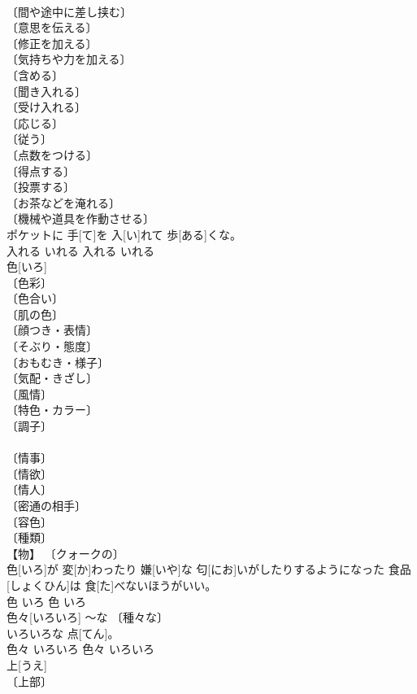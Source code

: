 \documentclass[8pt]{extreport}
\begin{document}
\begin{CJK}{UTF8}{min}
\\	〔間や途中に差し挟む〕 
\\	〔意思を伝える〕 
\\	〔修正を加える〕 
\\	〔気持ちや力を加える〕 
\\	〔含める〕 
\\	〔聞き入れる〕 
\\	〔受け入れる〕 
\\	〔応じる〕 
\\	〔従う〕 
\\	〔点数をつける〕 
\\	〔得点する〕 
\\	〔投票する〕 
\\	〔お茶などを淹れる〕 
\\	〔機械や道具を作動させる〕 
\\	ポケットに 手[て]を 入[い]れて 歩[ある]くな。	
\\	入れる	いれる	入れる	いれる	
\\	色[いろ]	
\\	〔色彩〕 
\\	〔色合い〕 
\\	〔肌の色〕 
\\	〔顔つき・表情〕 
\\	〔そぶり・態度〕 
\\	〔おもむき・様子〕 
\\	〔気配・きざし〕 
\\	〔風情〕 
\\	〔特色・カラー〕 
\\	〔調子〕 
\\	[⇒ねいろ, こわいろ] 
\\	〔情事〕 
\\	〔情欲〕 
\\	〔情人〕 
\\	〔密通の相手〕 
\\	〔容色〕 
\\	〔種類〕 
\\	【物】 〔クォークの〕 
\\	色[いろ]が 変[か]わったり 嫌[いや]な 匂[にお]いがしたりするようになった 食品[しょくひん]は 食[た]べないほうがいい。	
\\	色	いろ	色	いろ	
\\	色々[いろいろ]	～な 〔種々な〕 
\\	いろいろな 点[てん]。	
\\	色々	いろいろ	色々	いろいろ	
\\	上[うえ]	
\\	〔上部〕 

\end{CJK}
\end{document}
